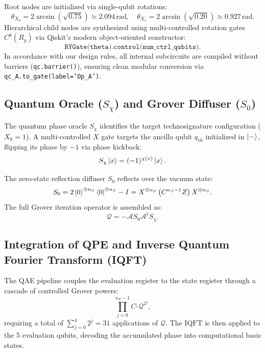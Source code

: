 Root nodes are initialized via single-qubit rotations:
\begin{equation}
\theta_{X_0} = 2\arcsin(\sqrt{0.75}) \approx 2.094\,\mathrm{rad}, \quad \theta_{X_1} = 2\arcsin(\sqrt{0.20}) \approx 0.927\,\mathrm{rad}.
\end{equation}
Hierarchical child nodes are synthesized using multi-controlled rotation gates $C^k(R_y)$ via Qiskit's modern object-oriented constructor:
\begin{equation}
\texttt{RYGate(theta).control(num\_ctrl\_qubits)}.
\end{equation}
In accordance with our design rules, all internal subcircuits are compiled without barriers (\texttt{qc.barrier()}), ensuring clean modular conversion via \texttt{qc\_A.to\_gate(label='Op\_A')}.

\subsection{Quantum Oracle (\texorpdfstring{$S_\chi$}{S\_chi}) and Grover Diffuser (\texorpdfstring{$S_0$}{S\_0})}
The quantum phase oracle $S_\chi$ identifies the target technosignature configuration ($X_8 = 1$). A multi-controlled $X$ gate targets the ancilla qubit $q_{16}$ initialized in $\left|-\right\rangle$, flipping its phase by $-1$ via phase kickback:
\begin{equation}
S_\chi \left|x\right\rangle = (-1)^{\chi(x)} \left|x\right\rangle.
\label{eq:phase_kickback_oracle_ch4}
\end{equation}

The zero-state reflection diffuser $S_0$ reflects over the vacuum state:
\begin{equation}
S_0 = 2\left|0\right\rangle^{\otimes n_S}\left\langle0\right|^{\otimes n_S} - I = X^{\otimes n_S} \left( C^{n_S-1} Z \right) X^{\otimes n_S}.
\label{eq:diffuser_reflection_circuit}
\end{equation}
The full Grover iteration operator is assembled as:
\begin{equation}
\mathcal{Q} = -\mathcal{A} S_0 \mathcal{A}^\dagger S_\chi.
\label{eq:grover_operator_composite_ch4}
\end{equation}

\subsection{Integration of QPE and Inverse Quantum Fourier Transform (IQFT)}
The QAE pipeline couples the evaluation register to the state register through a cascade of controlled Grover powers:
\begin{equation}
\prod_{j=0}^{n_E-1} C\text{-}\mathcal{Q}^{2^j},
\label{eq:controlled_grover_cascade}
\end{equation}
requiring a total of $\sum_{j=0}^4 2^j = 31$ applications of $\mathcal{Q}$. The $\mathrm{IQFT}$ is then applied to the 5 evaluation qubits, decoding the accumulated phase into computational basis states.

